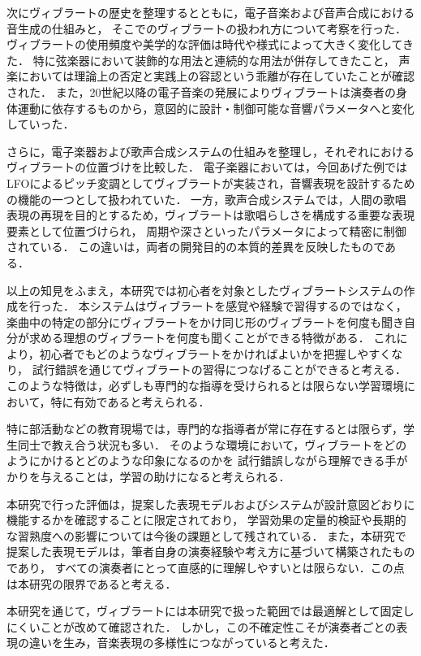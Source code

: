次にヴィブラートの歴史を整理するとともに，電子音楽および音声合成における音生成の仕組みと，
そこでのヴィブラートの扱われ方について考察を行った．
ヴィブラートの使用頻度や美学的な評価は時代や様式によって大きく変化してきた．
特に弦楽器において装飾的な用法と連続的な用法が併存してきたこと，
声楽においては理論上の否定と実践上の容認という乖離が存在していたことが確認された．
また，20世紀以降の電子音楽の発展によりヴィブラートは演奏者の身体運動に依存するものから，意図的に設計・制御可能な音響パラメータへと変化していった．

さらに，電子楽器および歌声合成システムの仕組みを整理し，それぞれにおけるヴィブラートの位置づけを比較した．
電子楽器においては，今回あげた例ではLFOによるピッチ変調としてヴィブラートが実装され，音響表現を設計するための機能の一つとして扱われていた．
一方，歌声合成システムでは，人間の歌唱表現の再現を目的とするため，ヴィブラートは歌唱らしさを構成する重要な表現要素として位置づけられ，
周期や深さといったパラメータによって精密に制御されている．
この違いは，両者の開発目的の本質的差異を反映したものである．

以上の知見をふまえ，本研究では初心者を対象としたヴィブラートシステムの作成を行った．
本システムはヴィブラートを感覚や経験で習得するのではなく，
楽曲中の特定の部分にヴィブラートをかけ同じ形のヴィブラートを何度も聞き自分が求める理想のヴィブラートを何度も聞くことができる特徴がある．
これにより，初心者でもどのようなヴィブラートをかければよいかを把握しやすくなり，
試行錯誤を通じてヴィブラートの習得につなげることができると考える．
このような特徴は，必ずしも専門的な指導を受けられるとは限らない学習環境において，特に有効であると考えられる．

特に部活動などの教育現場では，専門的な指導者が常に存在するとは限らず，学生同士で教え合う状況も多い．
そのような環境において，ヴィブラートをどのようにかけるとどのような印象になるのかを
試行錯誤しながら理解できる手がかりを与えることは，学習の助けになると考えられる．

本研究で行った評価は，提案した表現モデルおよびシステムが設計意図どおりに機能するかを確認することに限定されており，
学習効果の定量的検証や長期的な習熟度への影響については今後の課題として残されている．
また，本研究で提案した表現モデルは，筆者自身の演奏経験や考え方に基づいて構築されたものであり，
すべての演奏者にとって直感的に理解しやすいとは限らない．この点は本研究の限界であると考える．

本研究を通じて，ヴィブラートには本研究で扱った範囲では最適解として固定しにくいことが改めて確認された．
しかし，この不確定性こそが演奏者ごとの表現の違いを生み，音楽表現の多様性につながっていると考えた．

